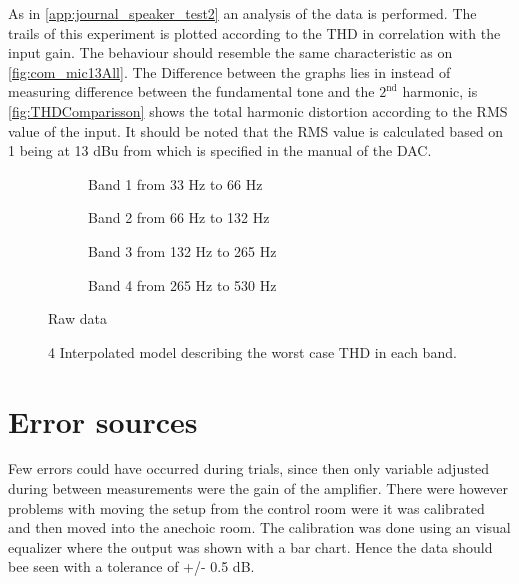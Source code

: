 As in \autoref{app:journal_speaker_test2} an analysis of the data is performed. The trails of this experiment is plotted according to the THD in correlation with the input gain. The behaviour should resemble the same characteristic as on \autoref{fig:com_mic13All}. The Difference between the graphs lies in instead of measuring difference between the fundamental tone and the $\text{2}^{\text{nd}}$ harmonic, is \autoref{fig:THDComparisson} shows the total harmonic distortion according to the RMS value of the input. It should be noted that the RMS value is calculated based on 1 being at 13 dBu from which is specified in the manual of the DAC.


\begin{figure}[H]
\centering
\begin{subfigure}[t]{0.45\textwidth}
    \centering
    
    \caption{Band 1 from 33 Hz to 66 Hz}
    \label{fig:Band1Model}
\end{subfigure}
\begin{subfigure}[t]{0.45\textwidth}
    \centering
    
    \caption{Band 2 from 66 Hz to 132 Hz}
    \label{fig:Band2Model}
\end{subfigure}
\begin{subfigure}[t]{0.45\textwidth}
    \centering
    
    \caption{Band 3 from 132 Hz to 265 Hz}
    \label{fig:Band3Model}
\end{subfigure}
\begin{subfigure}[t]{0.45\textwidth}
    \centering
    
    \caption{Band 4 from 265 Hz to 530 Hz}
    \label{fig:Band4Model}
\end{subfigure}
\caption{Raw data}
\label{fig:THDComparisson}
\end{figure} 


\begin{figure}[H]
    \centering
    
    \caption{4 Interpolated model describing the worst case THD in each band.}
    \label{fig:CombinedModel}
\end{figure}






\section{Error sources}
Few errors could have occurred during trials, since then only variable adjusted during between measurements were the gain of the amplifier. There were however problems with moving the setup from the control room were it was calibrated and then moved into the anechoic room. The
calibration was done using an visual equalizer where the output was shown with a bar chart. Hence the data should bee seen with a tolerance of +/- 0.5 dB.

